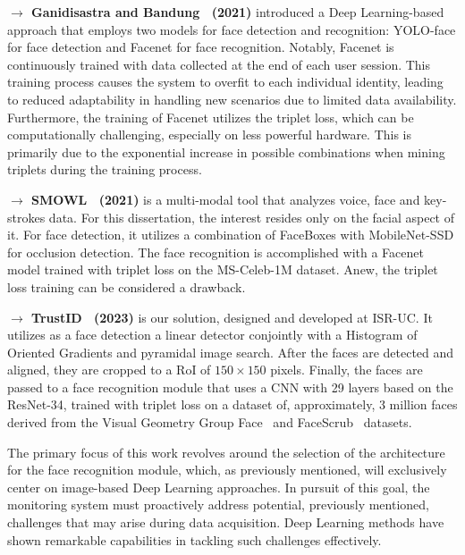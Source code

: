 \documentclass[class=report, crop=false, a4paper, 12pt]{standalone}
\begin{document}
\vspace{0.7\baselineskip}
\noindent\textbf{$\rightarrow$ Ganidisastra and Bandung~\autocite{ganidisastraIncrementalTrainingDeep2021} (2021)} introduced a Deep Learning-based approach that employs two models for face detection and recognition: YOLO-face for face detection and Facenet for face recognition. Notably, Facenet is continuously trained with data collected at the end of each user session. This training process causes the system to overfit to each individual identity, leading to reduced adaptability in handling new scenarios due to limited data availability. Furthermore, the training of Facenet utilizes the triplet loss, which can be computationally challenging, especially on less powerful hardware. This is primarily due to the exponential increase in possible combinations when mining triplets during the training process.

\vspace{0.7\baselineskip}
\noindent\textbf{$\rightarrow$ SMOWL~\autocite{labayenOnlineStudentAuthentication2021} (2021)} is a multi-modal tool that analyzes voice, face and key-strokes data. For this dissertation, the interest resides only on the facial aspect of it. For face detection, it utilizes a combination of FaceBoxes with MobileNet-SSD for occlusion detection. The face recognition is accomplished with a Facenet model trained with triplet loss on the MS-Celeb-1M dataset. Anew, the triplet loss training can be considered a drawback. 

\vspace{0.7\baselineskip}
\noindent\textbf{$\rightarrow$ TrustID~\autocite{fariaImagebasedFaceVerification2023} (2023)} is our solution, designed and developed at \acrshort{ISR-UC}. It utilizes as a face detection a linear detector conjointly with a Histogram of Oriented Gradients and pyramidal image search. After the faces are detected and aligned, they are cropped to a \gls{RoI} of $150\times150$ pixels. Finally, the faces are passed to a face recognition module that uses a CNN with 29 layers based on the ResNet-34, trained with triplet loss on a dataset of, approximately, 3 million faces derived from the Visual Geometry Group
Face~\autocite{parkhiDeepFaceRecognition2015} and FaceScrub~\autocite{ngDatadrivenApproachCleaning2014} datasets.


\vspace{\baselineskip}
\par The primary focus of this work revolves around the selection of the architecture for the face recognition module, which, as previously mentioned, will exclusively center on image-based Deep Learning approaches. In pursuit of this goal, the monitoring system must proactively address potential, previously mentioned, challenges that may arise during data acquisition. Deep Learning methods have shown remarkable capabilities in tackling such challenges effectively.
\end{document}
